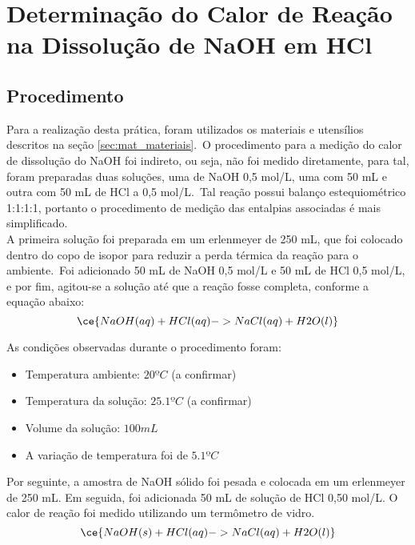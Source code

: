 \section[Parte Experimental]{Determinação do Calor de Reação na Dissolução de NaOH em HCl}\label{sec:parte_experimental}
    \subsection{Procedimento}\label{sec:procedimento}

        \indent Para a realização desta prática, foram utilizados os materiais e utensílios descritos na seção \ref{sec:mat_materiais}.\ O procedimento para a medição do calor de dissolução do NaOH foi indireto, ou seja, não foi medido diretamente, para tal, foram preparadas duas soluções, uma de NaOH 0,5 mol/L, uma com 50 mL e outra com 50 mL de HCl a 0,5 mol/L.\ Tal reação possui balanço estequiométrico 1:1:1:1, portanto o procedimento de medição das entalpias associadas é mais simplificado.\\
        
        \indent A primeira solução foi preparada em um erlenmeyer de 250 mL, que foi colocado dentro do copo de isopor para reduzir a perda térmica da reação para o ambiente.\ Foi adicionado 50 mL de NaOH 0,5 mol/L e 50 mL de HCl 0,5 mol/L, e por fim, agitou-se a solução até que a reação fosse completa, conforme a equação abaixo:
        \begin{equation}
            \ce{NaOH(aq) + HCl(aq) -> NaCl(aq) + H2O(l)}
        \end{equation}
    
    	\indent As condições observadas durante o procedimento foram:
    	\begin{itemize}
    		\item Temperatura ambiente: $20ºC$ (a confirmar)
    		\item Temperatura da solução: $25.1ºC$ (a confirmar)
            \item Volume da solução: $100 mL$
            \item A variação de temperatura foi de $5.1ºC$
    	\end{itemize}

        \indent Por seguinte, a amostra de NaOH sólido foi pesada e colocada em um erlenmeyer de 250 mL. Em seguida, foi adicionada 50 mL de solução de HCl 0,50 mol/L. O calor de reação foi medido utilizando um termômetro de vidro.
        \begin{equation}
            \ce{NaOH(s) + HCl(aq) -> NaCl(aq) + H2O(l)}
        \end{equation}

